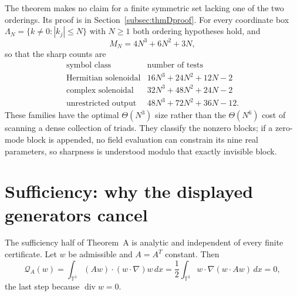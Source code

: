 \documentclass[11pt]{article}
\theoremstyle{definition}
\theoremstyle{remark}
\theoremstyle{plain}
\DeclareMathOperator{\dv}{div}
\newcommand{\T}{\mathbb{T}}
\newcommand{\Qform}{\mathcal{Q}}
\begin{document}
The theorem makes no claim for a finite symmetric set lacking one of the two
orderings. Its proof is in Section~\ref{subsec:thmDproof}. For every
coordinate box $\Lambda_{N}=\{k\ne0:|k_{j}|\le N\}$ with $N\ge1$ both ordering
hypotheses hold, and
\begin{equation}
\label{eq:boxcount}
M_{N}=4N^{3}+6N^{2}+3N ,
\end{equation}
so that the sharp counts are
\begin{equation}
\label{eq:boxtests}
\begin{array}{c|c}
\text{symbol class}&\text{number of tests}\\ \hline
\text{Hermitian solenoidal}&16N^{3}+24N^{2}+12N-2\\
\text{complex solenoidal}&32N^{3}+48N^{2}+24N-2\\
\text{unrestricted output}&48N^{3}+72N^{2}+36N-12 .
\end{array}
\end{equation}
These families have the optimal $\Theta(N^{3})$ size rather than the
$\Theta(N^{6})$ cost of scanning a dense collection of triads. They classify
the nonzero blocks; if a zero-mode block is appended, no field evaluation can
constrain its nine real parameters, so sharpness is understood modulo that
exactly invisible block.

\section{Sufficiency: why the displayed generators cancel}
\label{sec:sufficiency}

The sufficiency half of Theorem~A is analytic and independent of every finite
certificate. Let $w$ be admissible and $A=A^{T}$ constant. Then
\begin{equation}
\label{eq:suff-A}
\Qform_{A}(w)
=\int_{\T^{3}}(Aw)\cdot(w\cdot\nabla)w\,dx
=\frac12\int_{\T^{3}}w\cdot\nabla(w\cdot Aw)\,dx=0 ,
\end{equation}
the last step because $\dv w=0$.
\end{document}
